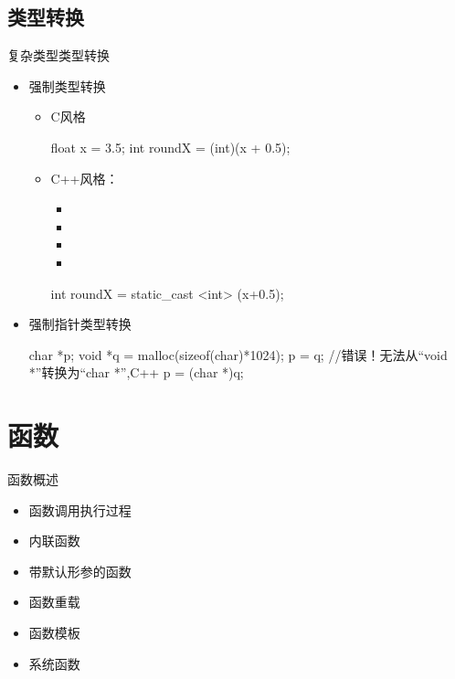 \subsection[类型转换]{类型转换}
\begin{frame}[fragile]{复杂类型}{类型转换}
  \stretchon
  \begin{itemize}
  \item 强制类型转换
    \begin{itemize}
    \item C风格\\
      \begin{cppcode}
float x = 3.5;
int roundX = (int)(x + 0.5);
      \end{cppcode}
    \item C++风格：\\      
      \begin{itemize}
      \item {}
      \item {}
      \item {}
      \item {}
      \end{itemize}
      \begin{cppcode}
int roundX = static_cast <int> (x+0.5);
      \end{cppcode}
    \end{itemize}
  \item 强制指针类型转换\\
    \begin{cppcode}
char *p;
void *q = malloc(sizeof(char)*1024);
p = q;    //错误！无法从“void *”转换为“char *”,C++
p =  (char *)q; 
    \end{cppcode}
  \end{itemize}
  \stretchoff
\end{frame}

\section[函数]{函数}\label{sec:chap02-sec06}
\begin{frame}{函数}{概述}
  \stretchon
  \begin{itemize}
  \item 函数调用执行过程
  \item 内联函数
  \item 带默认形参的函数
  \item 函数重载
  \item 函数模板
  \item 系统函数
  \end{itemize}
  \stretchoff
\end{frame}

